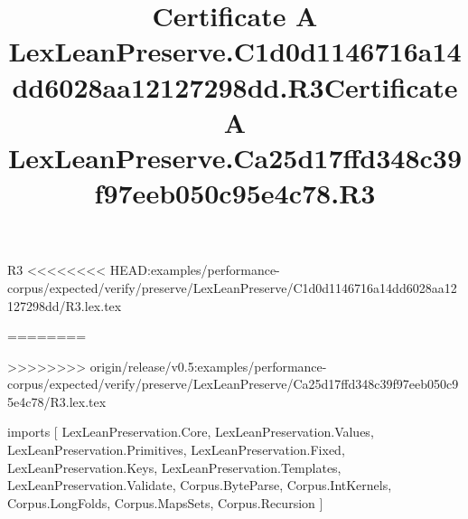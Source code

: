 \begin{lexlean}{R3}
<<<<<<<< HEAD:examples/performance-corpus/expected/verify/preserve/LexLeanPreserve/C1d0d1146716a14dd6028aa12127298dd/R3.lex.tex
\title{Certificate A LexLeanPreserve.C1d0d1146716a14dd6028aa12127298dd.R3}
========
\title{Certificate A LexLeanPreserve.Ca25d17ffd348c39f97eeb050c95e4c78.R3}
>>>>>>>> origin/release/v0.5:examples/performance-corpus/expected/verify/preserve/LexLeanPreserve/Ca25d17ffd348c39f97eeb050c95e4c78/R3.lex.tex
\begin{coremodule}
imports [
  LexLeanPreservation.Core,
  LexLeanPreservation.Values,
  LexLeanPreservation.Primitives,
  LexLeanPreservation.Fixed,
  LexLeanPreservation.Keys,
  LexLeanPreservation.Templates,
  LexLeanPreservation.Validate,
  Corpus.ByteParse,
  Corpus.IntKernels,
  Corpus.LongFolds,
  Corpus.MapsSets,
  Corpus.Recursion
]


\end{coremodule}
\end{lexlean}
